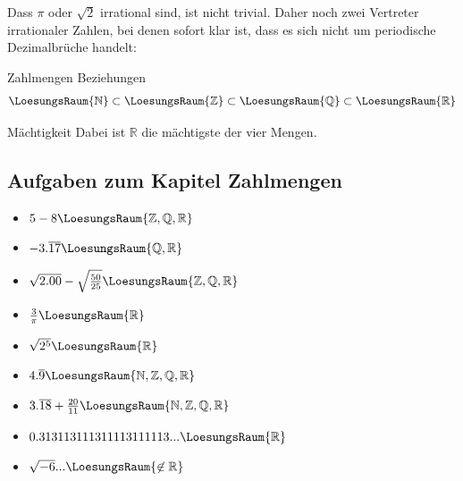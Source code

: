 Dass $\pi$ oder $\sqrt{2}$ irrational sind, ist nicht trivial. Daher
noch zwei Vertreter irrationaler Zahlen, bei denen sofort klar ist,
dass es sich nicht um periodische Dezimalbrüche handelt:


\begin{gesetz}{Zahlmengen Beziehungen}{}
$$\LoesungsRaum{\mathbb{N}} \subset \LoesungsRaum{\mathbb{Z}} \subset
  \LoesungsRaum{\mathbb{Q}} \subset \LoesungsRaum{\mathbb{R}} $$%
\end{gesetz}


\begin{bemerkung}{Mächtigkeit}{}
  Dabei ist $\mathbb{R}$ die mächtigste der vier Mengen. 
\end{bemerkung}



\subsection*{Aufgaben zum Kapitel Zahlmengen}


\begin{itemize}
\item $5-8 \LoesungsRaum{\mathbb{Z,Q,R}}$
\item $-3.\overline{17} \LoesungsRaum{\mathbb{Q,R}}$
\item $\sqrt{2.00} - \sqrt{\frac{50}{25}} \LoesungsRaum{\mathbb{Z,Q,R}}$
\item $\frac{3}{\pi} \LoesungsRaum{\mathbb{R}}$
\item $\sqrt{2^5}\LoesungsRaum{\mathbb{R}}$
\item $4.\overline{9} \LoesungsRaum{\mathbb{N,Z,Q,R}}$
\item $3.\overline{18}+\frac{20}{11} \LoesungsRaum{\mathbb{N,Z,Q,R}}$
\item $0.313113111311113111113... \LoesungsRaum{\mathbb{R}}$
\item $\sqrt{-6}... \LoesungsRaum{\not\in\mathbb{R}}$
\end{itemize} 


\TNTeop{}
